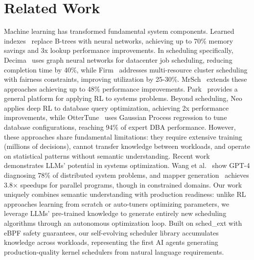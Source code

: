 \section{Related Work}
\label{sec:related}

Machine learning has transformed fundamental system components. Learned indexes~\cite{kraska2018learned} replace B-trees with neural networks, achieving up to 70\% memory savings and 3x lookup performance improvements. In scheduling specifically, Decima~\cite{mao2019decima} uses graph neural networks for datacenter job scheduling, reducing completion time by 40\%, while Firm~\cite{qiu2020firm} addresses multi-resource cluster scheduling with fairness constraints, improving utilization by 25-30\%. MrSch~\cite{zhang2024mrsch} extends these approaches achieving up to 48\% performance improvements. Park~\cite{mao2019park} provides a general platform for applying RL to systems problems. Beyond scheduling, Neo~\cite{marcus2019neo} applies deep RL to database query optimization, achieving 2x performance improvements, while OtterTune~\cite{vanaken2017ottertune} uses Gaussian Process regression to tune database configurations, reaching 94\% of expert DBA performance. However, these approaches share fundamental limitations: they require extensive training (millions of decisions), cannot transfer knowledge between workloads, and operate on statistical patterns without semantic understanding. Recent work demonstrates LLMs' potential in systems optimization. Wang et al.~\cite{wang2024llmsys} show GPT-4 diagnosing 78\% of distributed system problems, and mapper generation~\cite{wei2024mapper} achieves 3.8× speedups for parallel programs, though in constrained domains. Our work uniquely combines semantic understanding with production readiness: unlike RL approaches learning from scratch or auto-tuners optimizing parameters, we leverage LLMs' pre-trained knowledge to generate entirely new scheduling algorithms through an autonomous optimization loop. Built on sched\_ext with eBPF safety guarantees, our self-evolving scheduler library accumulates knowledge across workloads, representing the first AI agents generating production-quality kernel schedulers from natural language requirements.